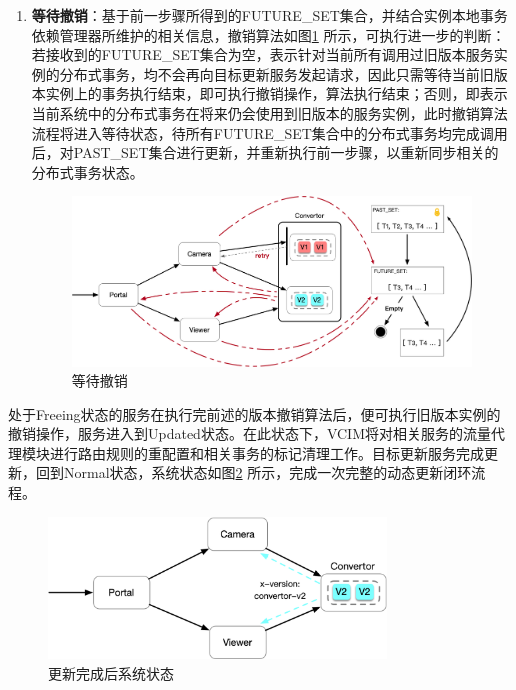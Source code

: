 \documentclass[macfonts,master]{njuthesis}
\begin{document}
\begin{enumerate}
	\item \textbf{等待撤销}：基于前一步骤所得到的FUTURE\_SET集合，并结合实例本地事务依赖管理器所维护的相关信息，撤销算法如图\ref{fig:revoke_3} 所示，可执行进一步的判断：若接收到的FUTURE\_SET集合为空，表示针对当前所有调用过旧版本服务实例的分布式事务，均不会再向目标更新服务发起请求，因此只需等待当前旧版本实例上的事务执行结束，即可执行撤销操作，算法执行结束；否则，即表示当前系统中的分布式事务在将来仍会使用到旧版本的服务实例，此时撤销算法流程将进入等待状态，待所有FUTURE\_SET集合中的分布式事务均完成调用后，对PAST\_SET集合进行更新，并重新执行前一步骤，以重新同步相关的分布式事务状态。

	\begin{figure}[!htbp]
	  \centering
	  \includegraphics[width= 1.0\textwidth]{image/revoke_3.png}
	  \caption{等待撤销}
	  \label{fig:revoke_3}
	\end{figure}
\end{enumerate}

处于Freeing状态的服务在执行完前述的版本撤销算法后，便可执行旧版本实例的撤销操作，服务进入到Updated状态。在此状态下，VCIM将对相关服务的流量代理模块进行路由规则的重配置和相关事务的标记清理工作。目标更新服务完成更新，回到Normal状态，系统状态如图\ref{fig:convertor_normal_v2} 所示，完成一次完整的动态更新闭环流程。

\begin{figure}[!htbp]
  \centering
  \includegraphics[width= 0.8\textwidth]{image/convertor_normal_v2.png}
  \caption{更新完成后系统状态}
  \label{fig:convertor_normal_v2}
\end{figure}
\end{document}
